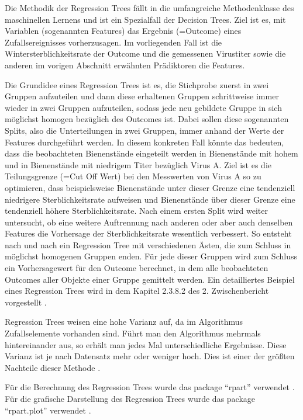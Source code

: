 Die Methodik der Regression Trees fällt in die umfangreiche Methodenklasse des maschinellen Lernens und ist ein Spezialfall der Decision Trees. Ziel ist es, mit Variablen (sogenannten Features) das Ergebnis (=Outcome) eines Zufallsereignisses vorherzusagen. Im vorliegenden Fall ist die Wintersterblichkeitsrate der Outcome und die gemessenen Virustiter sowie die anderen im vorigen Abschnitt erwähnten Prädiktoren die Features. 

Die Grundidee eines Regression Trees ist es, die Stichprobe zuerst in zwei Gruppen aufzuteilen und dann diese erhaltenen Gruppen schrittweise immer wieder in zwei Gruppen aufzuteilen, sodass jede neu gebildete Gruppe in sich möglichst homogen bezüglich des Outcomes ist. Dabei sollen diese sogenannten Splits, also die Unterteilungen in zwei Gruppen, immer anhand der Werte der Features durchgeführt werden. In diesem konkreten Fall könnte das bedeuten, dass die beobachteten Bienenstände eingeteilt werden in Bienenstände mit hohem und in Bienenstände mit niedrigem Titer bezüglich Virus A. Ziel ist es die Teilungsgrenze (=Cut Off Wert) bei den Messwerten von Virus A so zu optimieren, dass beispielsweise Bienenstände unter dieser Grenze eine tendenziell niedrigere Sterblichkeitsrate aufweisen und Bienenstände über dieser Grenze eine tendenziell höhere Sterblichkeitsrate. Nach einem ersten Split wird weiter untersucht, ob eine weitere Auftrennung nach anderen oder aber auch denselben Features die Vorhersage der Sterblichkeitsrate wesentlich verbessert. So entsteht nach und nach ein Regression Tree mit verschiedenen Ästen, die zum Schluss in möglichst homogenen Gruppen enden. Für jede dieser Gruppen wird zum Schluss ein Vorhersagewert für den Outcome berechnet, in dem alle beobachteten Outcomes aller Objekte einer Gruppe gemittelt werden. Ein detailliertes Beispiel eines Regression Trees wird in dem Kapitel 2.3.8.2 des 2. Zwischenbericht vorgestellt \citep{brodschneider2019b}.

Regression Trees weisen eine hohe Varianz auf, da im Algorithmus Zufallselemente vorhanden sind. Führt man den Algorithmus mehrmals hintereinander aus, so erhält man jedes Mal unterschiedliche Ergebnisse. Diese Varianz ist je nach Datensatz mehr oder weniger hoch. Dies ist einer der größten Nachteile dieser Methode \citep{breiman1984}.

Für die Berechnung des Regression Trees wurde das package \enquote{rpart} verwendet \citep{rpart}. Für die grafische Darstellung des Regression Trees wurde das package \enquote{rpart.plot} verwendet \citep{rpart.plot}.



